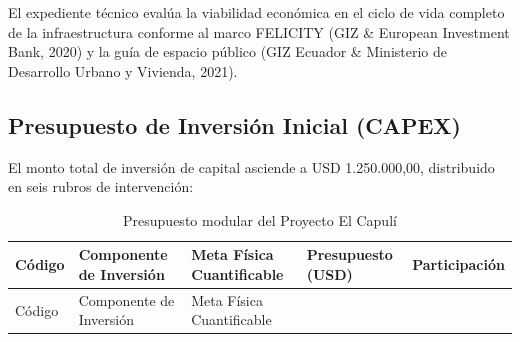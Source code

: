 \documentclass[
  spanish,
  letterpaper,
  DIV=11,
  numbers=noendperiod]{scrartcl}
\begin{document}
El expediente técnico evalúa la viabilidad económica en el ciclo de vida
completo de la infraestructura conforme al marco FELICITY (GIZ \&
European Investment Bank, 2020) y la guía de espacio público (GIZ
Ecuador \& Ministerio de Desarrollo Urbano y Vivienda, 2021).

\subsection{Presupuesto de Inversión Inicial
(CAPEX)}\label{presupuesto-de-inversiuxf3n-inicial-capex}

El monto total de inversión de capital asciende a USD 1.250.000,00,
distribuido en seis rubros de intervención:

\begin{longtable}[]{@{}
  >{\centering\arraybackslash}p{}
  >{\raggedright\arraybackslash}p{}
  >{\raggedright\arraybackslash}p{}
  >{\centering\arraybackslash}p{}
  >{\centering\arraybackslash}p{}@{}}
\caption{Presupuesto modular del Proyecto El
Capulí}\label{tbl-capex}\tabularnewline
\toprule\noalign{}
\begin{minipage}[b]{\linewidth}\centering
Código
\end{minipage} & \begin{minipage}[b]{\linewidth}\raggedright
Componente de Inversión
\end{minipage} & \begin{minipage}[b]{\linewidth}\raggedright
Meta Física Cuantificable
\end{minipage} & \begin{minipage}[b]{\linewidth}\centering
Presupuesto (USD)
\end{minipage} & \begin{minipage}[b]{\linewidth}\centering
Participación
\end{minipage} \\
\midrule\noalign{}
\endfirsthead
\toprule\noalign{}
\begin{minipage}[b]{\linewidth}\centering
Código
\end{minipage} & \begin{minipage}[b]{\linewidth}\raggedright
Componente de Inversión
\end{minipage} & \begin{minipage}[b]{\linewidth}\raggedright
Meta Física Cuantificable

\end{minipage}
\end{longtable}
\end{document}

